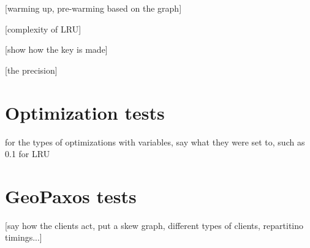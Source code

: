 [warming up, pre-warming based on the graph]

[complexity of LRU]

[show how the key is made]

[the precision]

\section{Optimization tests}\label{sec:optimization-tests}

for the types of optimizations with variables, say what they were set to, such as 0.1 for LRU

\section{GeoPaxos tests}\label{sec:geopaxos-tests}
[say how the clients act, put a skew graph, different types of clients, repartitino timings...]